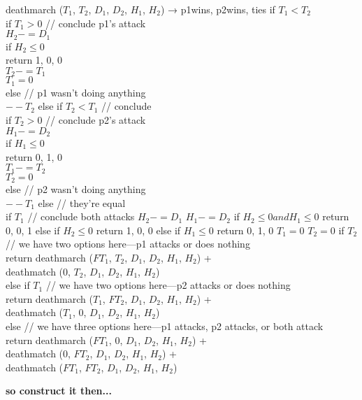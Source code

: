 deathmarch ($T_1$, $T_2$, $D_1$, $D_2$, $H_1$, $H_2$) → {p1wins, p2wins, ties}
if $T_1 < T_2$\\
  if $T_1 > 0$ // conclude p1's attack \\
    $H_2 -= D_1$ \\
    if $H_2 \le 0$ \\
      return 1, 0, 0 \\
    $T_2 -= T_1$ \\
    $T_1 = 0$ \\
  else // p1 wasn't doing anything \\
    $--T_2$
else if $T_2 < T_1$ // conclude \\
  if $T_2 > 0$ // conclude p2's attack \\
    $H_1 -= D_2$ \\
    if $H_1 \le 0$ \\
      return 0, 1, 0 \\
    $T_1 -= T_2$ \\
    $T_2 = 0$ \\
  else // p2 wasn't doing anything \\
    $--T_1$
else // they're equal \\
  if $T_1$ // conclude both attacks
    $H_2 -= D_1$
    $H_1 -= D_2$
    if $H_2 \le 0 and H_1 \le 0$
      return 0, 0, 1
    else if $H_2 \le 0$
      return 1, 0, 0
    else if $H_1 \le 0$
      return 0, 1, 0
    $T_1 = 0$
    $T_2 = 0$
if $T_2$ // we have two options here---p1 attacks or does nothing \\
    return deathmarch ($FT_1$, $T_2$, $D_1$, $D_2$, $H_1$, $H_2$) + \\
           deathmatch (0, $T_2$, $D_1$, $D_2$, $H_1$, $H_2$) \\
else if $T_1$ // we have two options here---p2 attacks or does nothing \\
    return deathmarch ($T_1$, $FT_2$, $D_1$, $D_2$, $H_1$, $H_2$) + \\
           deathmatch ($T_1$, 0, $D_1$, $D_2$, $H_1$, $H_2$) \\
else // we have three options here---p1 attacks, p2 attacks, or both attack \\
    return deathmarch ($FT_1$, 0, $D_1$, $D_2$, $H_1$, $H_2$) + \\
           deathmatch (0, $FT_2$, $D_1$, $D_2$, $H_1$, $H_2$) + \\
           deathmatch ($FT_1$, $FT_2$, $D_1$, $D_2$, $H_1$, $H_2$)

\textbf{so construct it then...}

